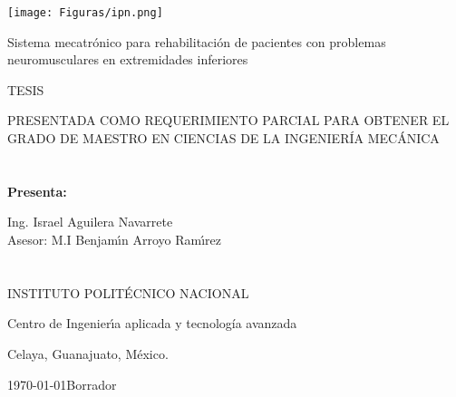 
\begin{center}
\centerline{\texttt{[image: Figuras/ipn.png]}}
\vspace{2cm}
{\Large Sistema mecatr\'{o}nico para rehabilitaci\'{o}n de pacientes con problemas  neuromusculares en extremidades inferiores} 

\vspace{1cm}

{\Huge TESIS}

\vspace{1cm}

{\small PRESENTADA COMO REQUERIMIENTO PARCIAL PARA OBTENER EL GRADO DE MAESTRO EN CIENCIAS DE LA INGENIER\'IA MEC\'{A}NICA}

\section*{}
{\bf Presenta:

Ing. Israel Aguilera Navarrete\\
Asesor: M.I Benjam\'{\i}n Arroyo Ram\'{\i}rez\\
\vspace{1cm}

\section*{}



{\LARGE INSTITUTO POLITÉCNICO NACIONAL}  
\vspace{1cm}


{\Huge Centro de Ingenier\'{\i}a aplicada y tecnología avanzada}} 





\vspace{2cm}
Celaya, Guanajuato, M\'exico.


\today Borrador
\end{center}
